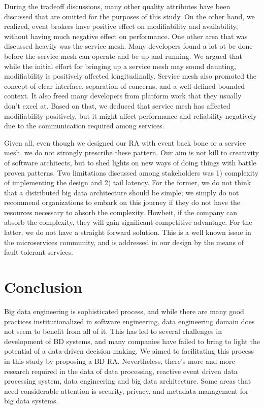 \documentclass[runningheads]{llncs}
\begin{document}
 During the tradeoff discussions, many other quality attributes have been discussed that are omitted for the purposes of this study. On the other hand, we realized, event brokers have positive effect on modifiability and availability, without having much negative effect on performance. One other area that was discussed heavily was the service mesh. Many developers found a lot ot be done before the service mesh can operate and be up and running. We argued that while the initial effort for bringing up a service mesh may sound daunting, modifiability is positively affected longitudinally. Service mesh also promoted the concept of clear interface, separation of concerns, and a well-defined bounded context. It also freed many developers from platform work that they usually don't excel at. Based on that, we deduced that service mesh has affected modifiability positively, but it might affect performance and reliability negatively due to the communication required among services. 

 Given all, even though we designed our RA with event back bone or a service mesh, we do not strongly prescribe these pattern. Our aim is not kill to creativity of software architects, but to shed lights on new ways of doing things with battle proven patterns. Two limitations discussed among stakeholders was 1) complexity of implementing the design and 2) tail latency. For the former, we do not think that a distributed big data architecture should be simple; we simply do not recommend organizations to embark on this journey if they do not have the resources necessary to absorb the complexity. Howbeit, if the company can absorb the complexity, they will gain significant competitive advantage. For the latter, we do not have a straight forward solution. This is a well known issue in the microservices community, and is addressed in our design by the means of fault-tolerant services.  

 \section{Conclusion}
  
 Big data engineering is sophisticated process, and while there are many good practices institutionalized in software engineering, data engineering domain does not seem to benefit from all of it. This has led to several challenges in development of BD systems, and many companies have failed to bring to light the potential of a data-driven decision making. We aimed to facilitating this process in this study by proposing a BD RA. Nevertheless, there's more and more research required in the data of data processing, reactive event driven data processing system, data engineering and big data architecture. Some areas that need considerable attention is security, privacy, and metadata management for big data systems.

%
%



\end{document}
